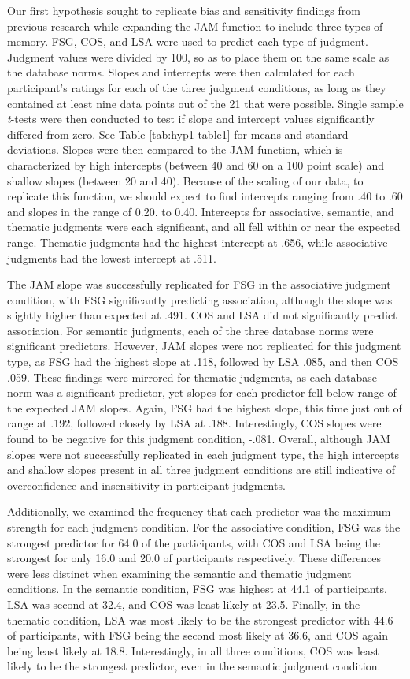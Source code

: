 \documentclass[english,man]{apa6}
\theoremstyle{definition}
\theoremstyle{definition}
\theoremstyle{definition}
\theoremstyle{remark}
\begin{document}
Our first hypothesis sought to replicate bias and sensitivity findings
from previous research while expanding the JAM function to include three
types of memory. FSG, COS, and LSA were used to predict each type of
judgment. Judgment values were divided by 100, so as to place them on
the same scale as the database norms. Slopes and intercepts were then
calculated for each participant's ratings for each of the three judgment
conditions, as long as they contained at least nine data points out of
the 21 that were possible. Single sample \emph{t}-tests were then
conducted to test if slope and intercept values significantly differed
from zero. See Table \ref{tab:hyp1-table1} for means and standard
deviations. Slopes were then compared to the JAM function, which is
characterized by high intercepts (between 40 and 60 on a 100 point
scale) and shallow slopes (between 20 and 40). Because of the scaling of
our data, to replicate this function, we should expect to find
intercepts ranging from .40 to .60 and slopes in the range of 0.20. to
0.40. Intercepts for associative, semantic, and thematic judgments were
each significant, and all fell within or near the expected range.
Thematic judgments had the highest intercept at .656, while associative
judgments had the lowest intercept at .511.

The JAM slope was successfully replicated for FSG in the associative
judgment condition, with FSG significantly predicting association,
although the slope was slightly higher than expected at .491. COS and
LSA did not significantly predict association. For semantic judgments,
each of the three database norms were significant predictors. However,
JAM slopes were not replicated for this judgment type, as FSG had the
highest slope at .118, followed by LSA .085, and then COS .059. These
findings were mirrored for thematic judgments, as each database norm was
a significant predictor, yet slopes for each predictor fell below range
of the expected JAM slopes. Again, FSG had the highest slope, this time
just out of range at .192, followed closely by LSA at .188.
Interestingly, COS slopes were found to be negative for this judgment
condition, -.081. Overall, although JAM slopes were not successfully
replicated in each judgment type, the high intercepts and shallow slopes
present in all three judgment conditions are still indicative of
overconfidence and insensitivity in participant judgments.

Additionally, we examined the frequency that each predictor was the
maximum strength for each judgment condition. For the associative
condition, FSG was the strongest predictor for 64.0 of the participants,
with COS and LSA being the strongest for only 16.0 and 20.0 of
participants respectively. These differences were less distinct when
examining the semantic and thematic judgment conditions. In the semantic
condition, FSG was highest at 44.1 of participants, LSA was second at
32.4, and COS was least likely at 23.5. Finally, in the thematic
condition, LSA was most likely to be the strongest predictor with 44.6
of participants, with FSG being the second most likely at 36.6, and COS
again being least likely at 18.8. Interestingly, in all three
conditions, COS was least likely to be the strongest predictor, even in
the semantic judgment condition.
\end{document}
